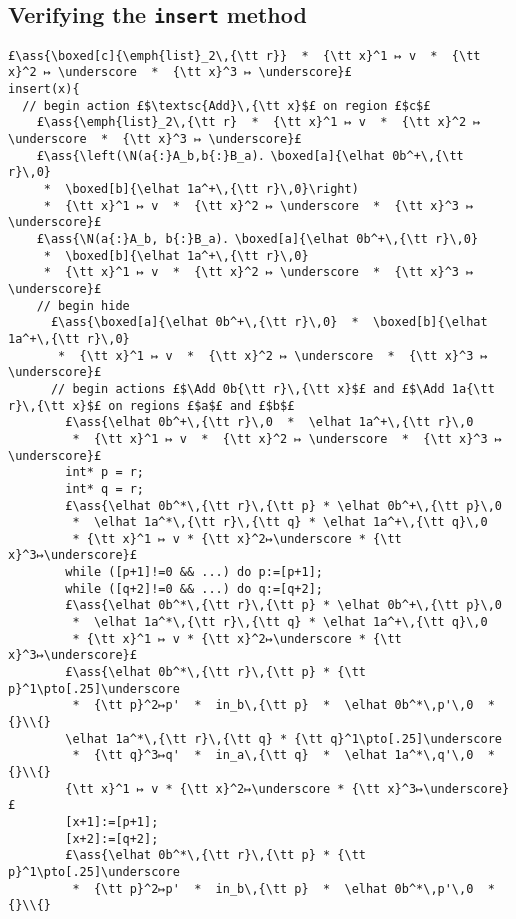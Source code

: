 \documentclass[12pt,a4paper]{article}
\makeatletter
\newcommand{\ml}[2][t]{\mbox{\mdseries\begin{tabular}[#1]{@{}L@{}}#2\end{tabular}}}
\newcommand{\ass}[1]{\ensuremath{{\color{blue}\left\{\ml[c]{#1}\right\}}}}
\makeatother
\begin{document}
\subsection{Verifying the {\tt insert} method}

\begin{lstlisting}
£\ass{\boxed[c]{\emph{list}_2\,{\tt r}}  *  {\tt x}^1 ↦ v  *  {\tt x}^2 ↦ \underscore  *  {\tt x}^3 ↦ \underscore}£
insert(x){
  // begin action £$\textsc{Add}\,{\tt x}$£ on region £$c$£ 
    £\ass{\emph{list}_2\,{\tt r}  *  {\tt x}^1 ↦ v  *  {\tt x}^2 ↦ \underscore  *  {\tt x}^3 ↦ \underscore}£
    £\ass{\left(\N(a{:}A_b,b{:}B_a)．\boxed[a]{\elhat 0b^+\,{\tt r}\,0} 
     *  \boxed[b]{\elhat 1a^+\,{\tt r}\,0}\right) 
     *  {\tt x}^1 ↦ v  *  {\tt x}^2 ↦ \underscore  *  {\tt x}^3 ↦ \underscore}£
    £\ass{\N(a{:}A_b, b{:}B_a)．\boxed[a]{\elhat 0b^+\,{\tt r}\,0} 
     *  \boxed[b]{\elhat 1a^+\,{\tt r}\,0} 
     *  {\tt x}^1 ↦ v  *  {\tt x}^2 ↦ \underscore  *  {\tt x}^3 ↦ \underscore}£
    // begin hide
      £\ass{\boxed[a]{\elhat 0b^+\,{\tt r}\,0}  *  \boxed[b]{\elhat 1a^+\,{\tt r}\,0} 
       *  {\tt x}^1 ↦ v  *  {\tt x}^2 ↦ \underscore  *  {\tt x}^3 ↦ \underscore}£
      // begin actions £$\Add 0b{\tt r}\,{\tt x}$£ and £$\Add 1a{\tt r}\,{\tt x}$£ on regions £$a$£ and £$b$£ 
        £\ass{\elhat 0b^+\,{\tt r}\,0  *  \elhat 1a^+\,{\tt r}\,0
         *  {\tt x}^1 ↦ v  *  {\tt x}^2 ↦ \underscore  *  {\tt x}^3 ↦ \underscore}£
        int* p = r;
        int* q = r;
        £\ass{\elhat 0b^*\,{\tt r}\,{\tt p} * \elhat 0b^+\,{\tt p}\,0
         *  \elhat 1a^*\,{\tt r}\,{\tt q} * \elhat 1a^+\,{\tt q}\,0
         * {\tt x}^1 ↦ v * {\tt x}^2↦\underscore * {\tt x}^3↦\underscore}£
        while ([p+1]!=0 && ...) do p:=[p+1];
        while ([q+2]!=0 && ...) do q:=[q+2];
        £\ass{\elhat 0b^*\,{\tt r}\,{\tt p} * \elhat 0b^+\,{\tt p}\,0
         *  \elhat 1a^*\,{\tt r}\,{\tt q} * \elhat 1a^+\,{\tt q}\,0
         * {\tt x}^1 ↦ v * {\tt x}^2↦\underscore * {\tt x}^3↦\underscore}£
        £\ass{\elhat 0b^*\,{\tt r}\,{\tt p} * {\tt p}^1\pto[.25]\underscore 
         *  {\tt p}^2↦p'  *  in_b\,{\tt p}  *  \elhat 0b^*\,p'\,0  * {}\\{}
        \elhat 1a^*\,{\tt r}\,{\tt q} * {\tt q}^1\pto[.25]\underscore 
         *  {\tt q}^3↦q'  *  in_a\,{\tt q}  *  \elhat 1a^*\,q'\,0  * {}\\{} 
        {\tt x}^1 ↦ v * {\tt x}^2↦\underscore * {\tt x}^3↦\underscore}£
        [x+1]:=[p+1];
        [x+2]:=[q+2];
        £\ass{\elhat 0b^*\,{\tt r}\,{\tt p} * {\tt p}^1\pto[.25]\underscore 
         *  {\tt p}^2↦p'  *  in_b\,{\tt p}  *  \elhat 0b^*\,p'\,0  * {}\\{}

\end{lstlisting}
\end{document}
